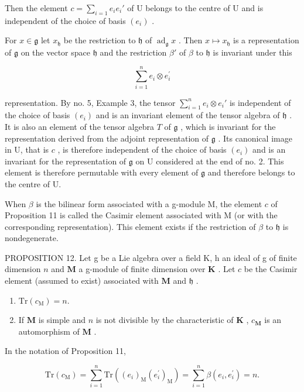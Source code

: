 Then the element \(c = \sum_{i=1} e_i e_i'\) of U belongs to the centre of U and is independent of the choice of basis \((e_i)\) .

For \(x \in \mathfrak{g}\) let \(x_{\mathfrak{h}}\) be the restriction to \(\mathfrak{h}\) of \(\operatorname{ad}_{\mathfrak{g}} x\) . Then \(x \mapsto x_{\mathfrak{h}}\) is a representation of \(\mathfrak{g}\) on the vector space \(\mathfrak{h}\) and the restriction \(\beta'\) of \(\beta\) to \(\mathfrak{h}\) is invariant under this

\[
\sum_ {i = 1} ^ {n} e _ {i} \otimes e _ {i} ^ {\prime}
\]

representation. By no. 5, Example 3, the tensor \(\sum_{i=1}^{n} e_i \otimes e_i'\) is independent of the choice of basis \((e_i)\) and is an invariant element of the tensor algebra of \(\mathfrak{h}\) . It is also an element of the tensor algebra \(T\) of \(\mathfrak{g}\) , which is invariant for the representation derived from the adjoint representation of \(\mathfrak{g}\) . Its canonical image in U, that is \(c\) , is therefore independent of the choice of basis \((e_i)\) and is an invariant for the representation of \(\mathfrak{g}\) on U considered at the end of no. 2. This element is therefore permutable with every element of \(\mathfrak{g}\) and therefore belongs to the centre of U.

When \(\beta\) is the bilinear form associated with a g-module M, the element \(c\) of Proposition 11 is called the Casimir element associated with M (or with the corresponding representation). This element exists if the restriction of \(\beta\) to \(\mathfrak{h}\) is nondegenerate.

PROPOSITION 12. Let g be a Lie algebra over a field K, h an ideal of g of finite dimension \(n\) and \(\mathbf{M}\) a g-module of finite dimension over \(\mathbf{K}\) . Let \(c\) be the Casimir element (assumed to exist) associated with \(\mathbf{M}\) and \(\mathfrak{h}\) .

\begin{enumerate}
\def\labelenumi{(\alph{enumi})}
\item
  \(\mathrm{Tr}(c_{\mathrm{M}})=n.\)
\item
  If \(\mathbf{M}\) is simple and \(n\) is not divisible by the characteristic of \(\mathbf{K}\) , \(c_{\mathbf{M}}\) is an automorphism of \(\mathbf{M}\) .
\end{enumerate}

In the notation of Proposition 11,

\[
\mathrm{Tr} (c _ {\mathrm{M}}) = \sum_ {i = 1} ^ {n} \mathrm{Tr} ((e _ {i}) _ {\mathrm{M}} (e _ {i} ^ {\prime}) _ {\mathrm{M}}) = \sum_ {i = 1} ^ {n} \beta (e _ {i}, e _ {i} ^ {\prime}) = n.
\]

